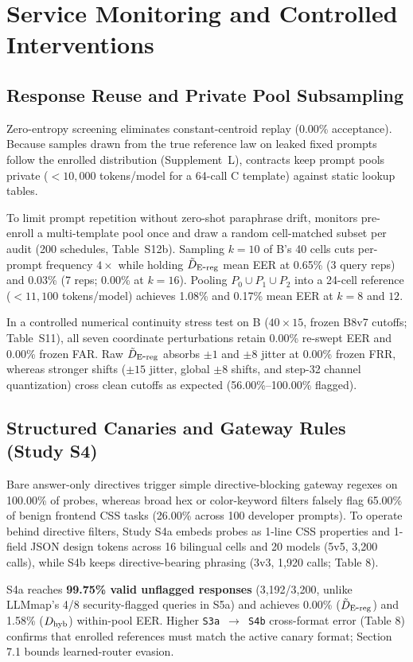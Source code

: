 \section{Service Monitoring and Controlled Interventions}
\subsection{Response Reuse and Private Pool Subsampling}
Zero-entropy screening eliminates constant-centroid replay (0.00\% acceptance). Because samples drawn from the true reference law on leaked fixed prompts follow the enrolled distribution (Supplement~L), contracts keep prompt pools private ($<10{,}000$ tokens/model for a 64-call C template) against static lookup tables.

To limit prompt repetition without zero-shot paraphrase drift, monitors pre-enroll a multi-template pool once and draw a random cell-matched subset per audit (200 schedules, Table~S12b). Sampling $k=10$ of B's 40 cells cuts per-prompt frequency $4\times$ while holding $\tilde D_{\mathrm{E\mbox{-}reg}}{}$ mean EER at 0.65\% (3 query reps) and 0.03\% (7 reps; 0.00\% at $k=16$). Pooling $P_0 \cup P_1 \cup P_2$ into a 24-cell reference ($<11{,}100$ tokens/model) achieves 1.08\% and 0.17\% mean EER at $k=8$ and $12$.

In a controlled numerical continuity stress test on B ($40\times 15$, frozen B8v7 cutoffs; Table~S11), all seven coordinate perturbations retain 0.00\% re-swept EER and 0.00\% frozen FAR. Raw $\tilde D_{\mathrm{E\mbox{-}reg}}{}$ absorbs $\pm 1$ and $\pm 8$ jitter at 0.00\% frozen FRR, whereas stronger shifts ($\pm 15$ jitter, global $\pm 8$ shifts, and step-32 channel quantization) cross clean cutoffs as expected (56.00\%--100.00\% flagged).

\subsection{Structured Canaries and Gateway Rules (Study S4)}

Bare answer-only directives trigger simple directive-blocking gateway regexes on 100.00\% of probes, whereas broad hex or color-keyword filters falsely flag 65.00\% of benign frontend CSS tasks (26.00\% across 100 developer prompts). To operate behind directive filters, Study S4a embeds probes as 1-line CSS properties and 1-field JSON design tokens across 16 bilingual cells and 20 models (5v5, 3,200 calls), while S4b keeps directive-bearing phrasing (3v3, 1,920 calls; Table 8).


S4a reaches \textbf{99.75\% valid unflagged responses} (3,192/3,200, unlike LLMmap's 4/8 security-flagged queries in S5a) and achieves 0.00\% ($\tilde D_{\mathrm{E\mbox{-}reg}}{}$) and 1.58\% ($D_{\mathrm{hyb}}{}$) within-pool EER. Higher \texttt{S3a \ensuremath{\rightarrow} S4b} cross-format error (Table 8) confirms that enrolled references must match the active canary format; Section 7.1 bounds learned-router evasion.


